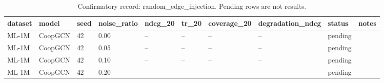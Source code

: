 \begin{table}[t]
\centering
\caption{Confirmatory record: random\_edge\_injection. Pending rows are not results.}
\begin{tabular}{llllllllll}
\toprule
\textbf{dataset} & \textbf{model} & \textbf{seed} & \textbf{noise\_ratio} & \textbf{ndcg\_20} & \textbf{tr\_20} & \textbf{coverage\_20} & \textbf{degradation\_ndcg} & \textbf{status} & \textbf{notes} \\
\midrule
ML-1M & CoopGCN & 42 & 0.00 & -- & -- & -- & -- & pending &  \\
ML-1M & CoopGCN & 42 & 0.05 & -- & -- & -- & -- & pending &  \\
ML-1M & CoopGCN & 42 & 0.10 & -- & -- & -- & -- & pending &  \\
ML-1M & CoopGCN & 42 & 0.20 & -- & -- & -- & -- & pending &  \\
\bottomrule
\end{tabular}
\end{table}
